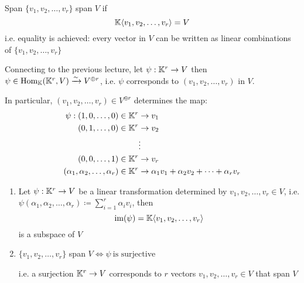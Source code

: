 

\begin{definition} {Span}
    \(\{v_1, v_2, \dots, v_r\}\) span \(V\) if \[
        \mathbb{K}\langle v_1, v_2, \dots, v_r \rangle = V
    \]
    i.e. equality is achieved: every vector in \(V\) can be written as linear combinations of \(\{v_1, v_2, \dots, v_r\}\)
\end{definition}

Connecting to the previous lecture, let \(\psi: \mathbb{K}^r \to V\) then \(\psi \in \mathrm{Hom}_{\mathbb{K}}(\mathbb{K}^r, V) \xrightarrow{\sim} V^{\oplus r}\), i.e. \(\psi\) corresponds to \((v_1, v_2, \dots, v_r)\) in \(V\).

In particular, \((v_1, v_2, \dots, v_r) \in V^{\oplus r}\) determines the map:
\begin{align*}
    \psi: (1, 0, \dots, 0) \in \mathbb{K}^r                & \to v_1                                             \\
    (0, 1, \dots, 0) \in \mathbb{K}^r                      & \to v_2                                             \\
                                                     & \vdots                                              \\
    (0, 0, \dots, 1) \in \mathbb{K}^r                      & \to v_r                                             \\
    (\alpha_1, \alpha_2, \dots, \alpha_r) \in \mathbb{K}^r & \to \alpha_1v_1 + \alpha_2v_2 + \dots + \alpha_rv_r
\end{align*}

\begin{lemma}
    \begin{enumerate}
        \item Let \(\psi: \mathbb{K}^r \to V\) be a linear transformation determined by \(v_1, v_2, \dots, v_r \in V\), i.e. \(\psi(\alpha_1, \alpha_2, \dots, \alpha_r) \coloneqq \sum_{i=1}^r \alpha_iv_i\), then \[
                  \mathrm{im}(\psi) = \mathbb{K}\langle v_1, v_2, \dots, v_r \rangle
              \] is a subspace of \(V\)
        \item \(\{v_1, v_2, \dots, v_r\}\) span \(V \Leftrightarrow \psi \:\text{is surjective}\: \)

              i.e. a surjection \(\mathbb{K}^r \to V\) corresponds to \(r\) vectors \(v_1, v_2, \dots, v_r \in V\) that span \(V\)
    \end{enumerate}
\end{lemma}

